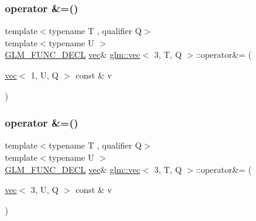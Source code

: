 \mbox{\label{structglm_1_1vec_3_013_00_01_t_00_01_q_01_4_a4004b269d4ba52855467734b9acbad9f}} 
\subsubsection{\texorpdfstring{operator \&=()}{operator \&=()}\hspace{0.1cm}{\footnotesize\ttfamily [2/3]}}
{\footnotesize\ttfamily template$<$typename T , qualifier Q$>$ \\
template$<$typename U $>$ \\
\hyperlink{setup_8hpp_ab2d052de21a70539923e9bcbf6e83a51}{G\+L\+M\+\_\+\+F\+U\+N\+C\+\_\+\+D\+E\+CL} \hyperlink{structglm_1_1vec}{vec}\& \hyperlink{structglm_1_1vec}{glm\+::vec}$<$ 3, T, Q $>$\+::operator\&= (\begin{DoxyParamCaption}\item[{\hyperlink{structglm_1_1vec}{vec}$<$ 1, U, Q $>$ const \&}]{v }\end{DoxyParamCaption})}

\mbox{\label{structglm_1_1vec_3_013_00_01_t_00_01_q_01_4_ab9bb5a0a46b3788c7ddfef17b53bae95}} 
\subsubsection{\texorpdfstring{operator \&=()}{operator \&=()}\hspace{0.1cm}{\footnotesize\ttfamily [3/3]}}
{\footnotesize\ttfamily template$<$typename T , qualifier Q$>$ \\
template$<$typename U $>$ \\
\hyperlink{setup_8hpp_ab2d052de21a70539923e9bcbf6e83a51}{G\+L\+M\+\_\+\+F\+U\+N\+C\+\_\+\+D\+E\+CL} \hyperlink{structglm_1_1vec}{vec}\& \hyperlink{structglm_1_1vec}{glm\+::vec}$<$ 3, T, Q $>$\+::operator\&= (\begin{DoxyParamCaption}\item[{\hyperlink{structglm_1_1vec}{vec}$<$ 3, U, Q $>$ const \&}]{v }\end{DoxyParamCaption})}

